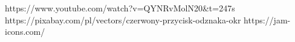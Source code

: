 https://www.youtube.com/watch?v=QYNRvMolN20&t=247s
https://pixabay.com/pl/vectors/czerwony-przycisk-odznaka-okr%
https://jam-icons.com/